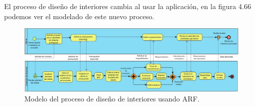 El proceso de diseño de interiores cambia al usar la aplicación, en la figura 4.66 podemos ver el modelado de este nuevo proceso.
\begin{figure}[!htbp]
	\centering
	\includegraphics[width=20cm,angle=270,origin=c]{imagenes/desarrollo/diagramas/NPMN_FINAL_ID.jpg}
	\caption{Modelo del proceso de diseño de interiores usando ARF.}
	\label{fig:bpmnarf}
\end{figure}
\clearpage